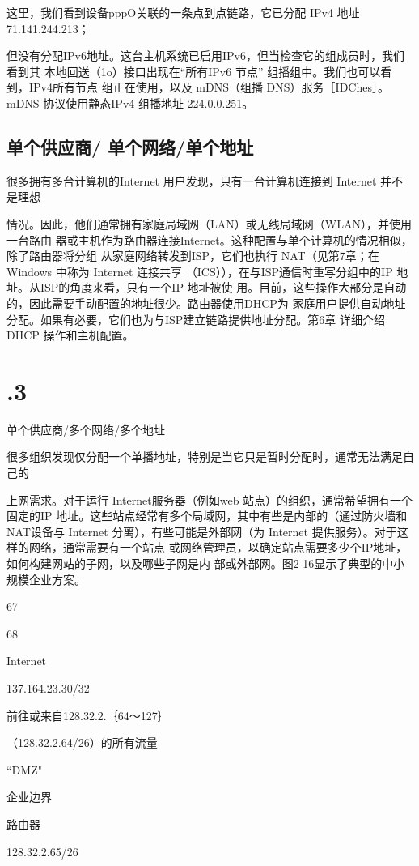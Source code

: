 这里，我们看到设备pppO关联的一条点到点链路，它已分配 IPv4 地址 71.141.244.213；

但没有分配IPv6地址。这台主机系统已启用IPv6，但当检查它的组成员时，我们看到其
本地回送（1o）接口出现在“所有IPv6 节点” 组播组中。我们也可以看到，IPv4所有节点
组正在使用，以及 mDNS（组播 DNS）服务［IDChes］。mDNS 协议使用静态IPv4 组播地址
224.0.0.251。

\subsection{单个供应商/ 单个网络/单个地址}
很多拥有多台计算机的Internet 用户发现，只有一台计算机连接到 Internet 并不是理想

情况。因此，他们通常拥有家庭局域网（LAN）或无线局域网（WLAN），并使用一台路由
器或主机作为路由器连接Internet。这种配置与单个计算机的情况相似，除了路由器将分组
从家庭网络转发到ISP，它们也执行 NAT（见第7章；在 Windows 中称为 Internet 连接共享
（ICS）），在与ISP通信时重写分组中的IP 地址。从ISP的角度来看，只有一个IP 地址被使
用。目前，这些操作大部分是自动的，因此需要手动配置的地址很少。路由器使用DHCP为
家庭用户提供自动地址分配。如果有必要，它们也为与ISP建立链路提供地址分配。第6章
详细介绍 DHCP 操作和主机配置。

\section{.3}
单个供应商/多个网络/多个地址

很多组织发现仅分配一个单播地址，特别是当它只是暂时分配时，通常无法满足自己的

上网需求。对于运行 Internet服务器（例如web 站点）的组织，通常希望拥有一个固定的IP
地址。这些站点经常有多个局域网，其中有些是内部的（通过防火墙和 NAT设备与 Internet
分离），有些可能是外部网（为 Internet 提供服务）。对于这样的网络，通常需要有一个站点
或网络管理员，以确定站点需要多少个IP地址，如何构建网站的子网，以及哪些子网是内
部或外部网。图2-16显示了典型的中小规模企业方案。

67

68

Internet

137.164.23.30/32

前往或来自128.32.2.｛64～127｝

（128.32.2.64/26）的所有流量

“DMZ"

企业边界

路由器

128.32.2.65/26

